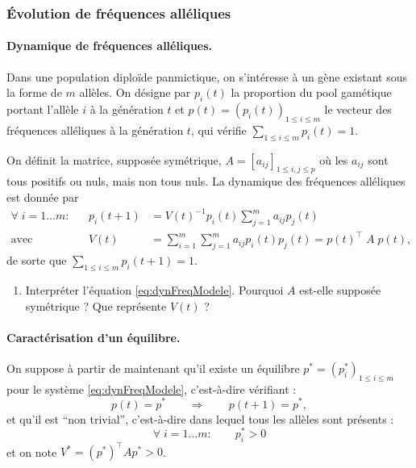 \subsubsection{\'Evolution de fréquences alléliques}

\paragraph{Dynamique de fréquences alléliques.}
Dans une population diploïde panmictique, on s’intéresse à un gène existant sous la forme de $m$ allèles. On désigne par $p_i(t)$ la proportion du pool gamétique portant l’allèle $i$  à la génération $t$ et $p(t) = (p_i(t))_{1 \leq i \leq m}$ le vecteur des fréquences alléliques à la génération $t$, qui vérifie $\sum_{1 \leq i \leq m}p_i(t) = 1$. 

On définit la matrice, supposée symétrique, $A = [a_{ij}]_{1 \leq i, j \leq p}$ où les $a_{ij}$ sont tous positifs ou nuls, mais non tous nuls. La dynamique des fréquences alléliques est donnée par
\begin{align} \label{eq:dynFreqModele}
  \forall \; i = 1 \dots m: & & 
  p_i(t+1) & = V(t)^{-1} p_i(t) \sum_{j=1}^m a_{ij} p_j(t) \\
  \text{avec} & & 
  V(t) & = \sum_{i=1}^m \sum_{j=1}^m a_{ij} p_i(t) p_j(t) = p(t)^\top \; A \; p(t), \nonumber
\end{align}
de sorte que $\sum_{1 \leq i \leq m} p_i(t+1) = 1$.

\bigskip
\begin{enumerate}
  \item Interpréter l'équation \eqref{eq:dynFreqModele}. Pourquoi $A$ est-elle supposée symétrique ? Que représente $V(t)$ ?
\end{enumerate}

\paragraph{Caractérisation d'un équilibre.}
On suppose à partir de maintenant qu'il existe un équilibre $p^* = (p^*_i)_{1 \leq i \leq m}$ pour le système \eqref{eq:dynFreqModele}, c'est-à-dire vérifiant : 
$$
p(t) = p^* \qquad \Rightarrow \qquad p(t+1) = p^*,
$$
et qu'il est ``non trivial'', c'est-à-dire dans lequel tous les allèles sont présents : 
$$
\forall \; i = 1 \dots m: \qquad p^*_i > 0
$$
et on note $V^* = (p^*)^\top A p^* > 0$.

